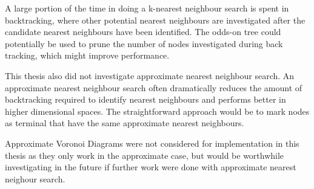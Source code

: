\documentclass[mcs]{scsthesis}
\begin{document}
A large portion of the time in doing a k-nearest neighbour search is spent in
backtracking, where other potential nearest neighbours are investigated after
the candidate nearest neighbours have been identified. The odds-on tree could
potentially be used to prune the number of nodes investigated during back
tracking, which might improve performance.

This thesis also did not investigate approximate nearest neighbour search. An
approximate nearest neighbour search often dramatically reduces the amount of
backtracking required to identify nearest neighbours and performs better in
higher dimensional spaces. The straightforward approach would be to mark nodes
as terminal that have the same approximate nearest neighbours.

Approximate Voronoi Diagrams \cite{avd} were not considered for implementation
in this thesis as they only work in the approximate case, but would be
worthwhile investigating in the future if further work were done with
approximate nearest neighour search.
\end{document}
